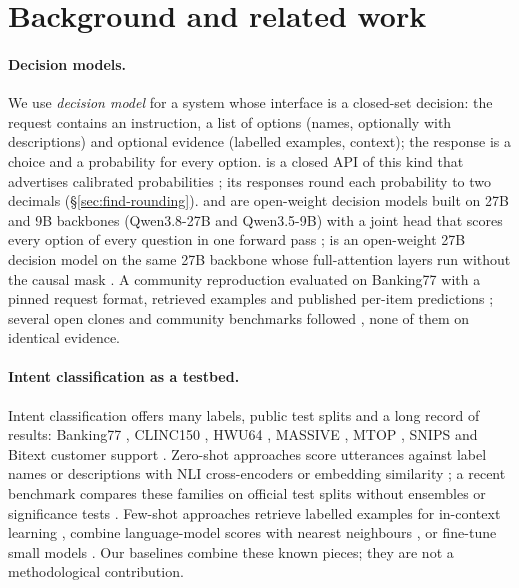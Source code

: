 \section{Background and related work}
\label{sec:background}

\paragraph{Decision models.} We use \emph{decision model} for a system whose interface is a closed-set decision:
the request contains an instruction, a list of options (names, optionally with descriptions) and optional evidence
(labelled examples, context); the response is a choice and a probability for every option. \jev{} is a closed API of
this kind that advertises calibrated probabilities \citep{typesafe-2026-jev}; its responses round each probability
to two decimals (\S\ref{sec:find-rounding}). \clef{} and \flash{} are open-weight decision models built on 27B and
9B backbones (Qwen3.8-27B and Qwen3.5-9B) with a joint head that scores every option of every question in one
forward pass \citep{cloudflare-2026-clef-card,cloudflare-2026-clef-flash-card}; \pplx{} is an open-weight 27B
decision model on the same 27B backbone whose full-attention layers run without the causal mask
\citep{perplexity-2026-pplx-decider-card}. A community reproduction evaluated \jev{} on Banking77 with a pinned request format,
retrieved examples and published per-item predictions \citep{smith-2026-jev-banking77}; several open clones and
community benchmarks followed \citep{cai-2026-open-jev,mehra-2026-jevbench,abdelstark-2026-jev-benchmarks}, none of
them on identical evidence.

\paragraph{Intent classification as a testbed.} Intent classification offers many labels, public test splits and a
long record of results: Banking77 \citep{casanueva-etal-2020-efficient}, CLINC150 \citep{larson-etal-2019-evaluation},
HWU64 \citep{liu-etal-2021-hwu64}, MASSIVE \citep{fitzgerald-etal-2023-massive}, MTOP \citep{li-etal-2021-mtop},
SNIPS \citep{coucke-etal-2018-snips} and Bitext customer support \citep{bitext-2023-customer-support}. Zero-shot
approaches score utterances against label names or descriptions with NLI cross-encoders
\citep{yin-etal-2019-benchmarking,laurer-etal-2023-less} or embedding similarity
\citep{hu-etal-2024-exploring,sung-etal-2023-pre}; a recent benchmark compares these families on official test
splits without ensembles or significance tests \citep{aarab-2026-btzsc}. Few-shot approaches retrieve labelled
examples for in-context learning \citep{milios-etal-2023-context,bertsch-etal-2024-long-context-icl}, combine
language-model scores with nearest neighbours \citep{xu-etal-2023-knn-prompting}, or fine-tune small models
\citep{tunstall-etal-2022-setfit,loukas-etal-2023-breaking-bank}. Our baselines combine these known pieces; they are
not a methodological contribution.


